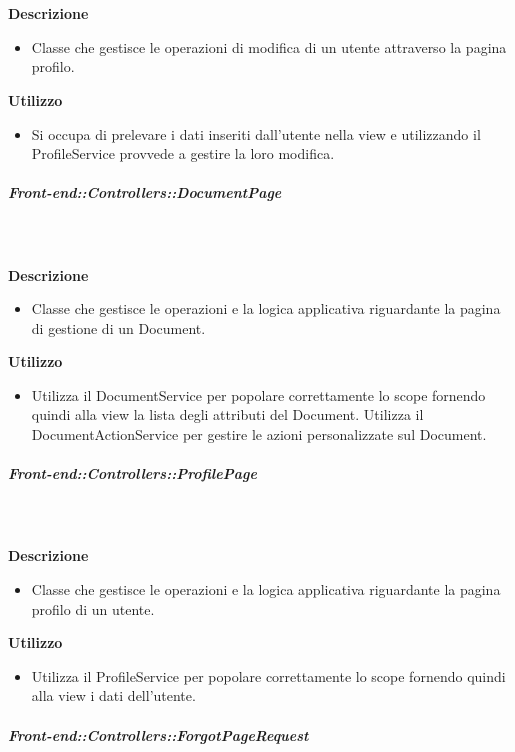         \textbf{\\ \\ Descrizione} 
          \begin{itemize}
            \item[] Classe che gestisce le operazioni di modifica di un utente attraverso la pagina profilo.
          \end{itemize}      
        \textbf{Utilizzo}  
          \begin{itemize}
            \item[] Si occupa di prelevare i dati inseriti dall'utente nella view e utilizzando il ProfileService provvede a gestire la loro modifica. 
          \end{itemize}
      \subparagraph{Front-end::Controllers::DocumentPage}
        
        \textbf{\\ \\ Descrizione} 
          \begin{itemize}
            \item[] Classe che gestisce le operazioni e la logica applicativa riguardante la pagina di gestione di un Document.
          \end{itemize}      
        \textbf{Utilizzo}  
          \begin{itemize}
            \item[] Utilizza il DocumentService per popolare correttamente lo scope fornendo quindi alla view la lista degli attributi del Document. \newline
Utilizza il DocumentActionService per gestire le azioni personalizzate sul Document.
          \end{itemize}
      \subparagraph{Front-end::Controllers::ProfilePage}
        
        \textbf{\\ \\ Descrizione} 
          \begin{itemize}
            \item[] Classe che gestisce le operazioni e la logica applicativa riguardante la pagina profilo di un utente.
          \end{itemize}      
        \textbf{Utilizzo}  
          \begin{itemize}
            \item[] Utilizza il ProfileService per popolare correttamente lo scope fornendo quindi alla view i dati dell'utente.
          \end{itemize}
      \subparagraph{Front-end::Controllers::ForgotPageRequest}
        
